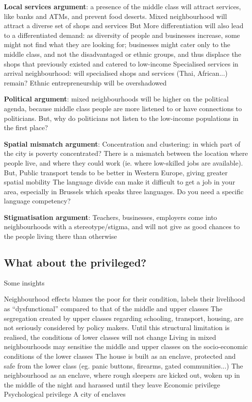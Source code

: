 \documentclass{article}
\begin{document}
\begin{outline}
	\1 \textbf{Local services argument}: a presence of the middle class will attract services, like banks and ATMs, and prevent food deserts. Mixed neighbourhood will attract a diverse set of shops and services
		\2 But
			\3 More differentiation will also lead to a differentiated demand: as diversity of people and businesses increase, some might not find what they are looking for; businesses might cater only to the middle class, and not the disadvantaged or ethnic groups, and thus displace the shops that previously existed and catered to low-income
			\3 Specialised services in arrival neighbourhood: will specialised shops and services (Thai, African...) remain?
			\3 Ethnic entrepreneurship will be overshadowed

	\1 \textbf{Political argument}: mixed neighbourhoods will be higher on the political agenda, because middle class people are more listened to or have connections to politicians. 
		\2 But, why do politicians not listen to the low-income populations in the first place?

	\1 \textbf{Spatial mismatch argument}: 
		\2 Concentration and clustering: in which part of the city is poverty concentrated? There is a mismatch between the location where people live, and where they could work (ie. where low-skilled jobs are available). 
		\2 But,
			\3 Public transport tends to be better in Western Europe, giving greater spatial mobility
			\3 The language divide can make it difficult to get a job in your area, especially in Brussels which speaks three languages. Do you need a specific language competency?
	
	\1 \textbf{Stigmatisation argument}: Teachers, businesses, employers come into neighbourhoods with a stereotype/stigma, and will not give as good chances to the people living there than otherwise
\end{outline}

\subsection{What about the privileged?}
Some insights
\begin{outline}
	\1 Neighbourhood effects blames the poor for their condition, labels their livelihood as ``dysfunctional'' compared to that of the middle and upper classes
	\1 The segregation created by upper classes regarding schooling, transport, housing, are not seriously considered by policy makers. Until this structural limitation is realised, the conditions of lower classes will not change
	\1 Living in mixed neighbourhoods may sensitise the middle and upper classes on the socio-economic conditions of the lower classes
	\1 The house is built as an enclave, protected and safe from the lower class (eg. panic buttons, firearms, gated communities...)
	\1 The neighbourhood as an enclave, where rough sleepers are kicked out, woken up in the middle of the night and harassed until they leave
		\2 Economic privilege
		\2 Psychological privilege
	\1 A city of enclaves
\end{outline}
\end{document}
